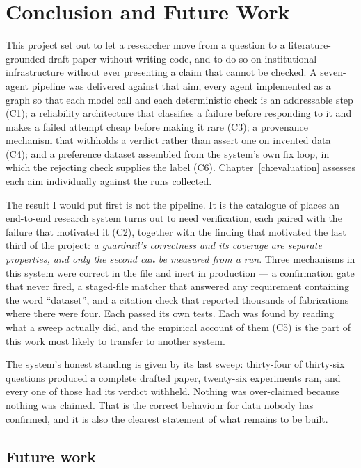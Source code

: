 \chapter{Conclusion and Future Work}
\label{ch:conclusion}


This project set out to let a researcher move from a question to a
literature-grounded draft paper without writing code, and to do so on
institutional infrastructure without ever presenting a claim that cannot be
checked. A seven-agent pipeline was delivered against that aim, every agent
implemented as a graph so that each model call and each deterministic check is an
addressable step (C1); a reliability architecture that classifies a failure before
responding to it and makes a failed attempt cheap before making it rare (C3); a
provenance mechanism that withholds a verdict rather than assert one on invented
data (C4); and a preference dataset assembled from the system's own fix loop, in
which the rejecting check supplies the label (C6). Chapter~\ref{ch:evaluation}
assesses each aim individually against the runs collected.

The result I would put first is not the pipeline. It is the catalogue of places an
end-to-end research system turns out to need verification, each paired with the
failure that motivated it (C2), together with the finding that motivated the last
third of the project: \emph{a guardrail's correctness and its coverage are separate
properties, and only the second can be measured from a run}. Three mechanisms in
this system were correct in the file and inert in production --- a confirmation
gate that never fired, a staged-file matcher that answered any requirement
containing the word ``dataset'', and a citation check that reported thousands of
fabrications where there were four. Each passed its own tests. Each was found by
reading what a sweep actually did, and the empirical account of them (C5) is the
part of this work most likely to transfer to another system.

The system's honest standing is given by its last sweep: thirty-four of thirty-six
questions produced a complete drafted paper, twenty-six experiments ran, and every
one of those had its verdict withheld. Nothing was over-claimed because nothing was
claimed. That is the correct behaviour for data nobody has confirmed, and it is
also the clearest statement of what remains to be built.

\section{Future work}
\label{sec:future-overlap}

